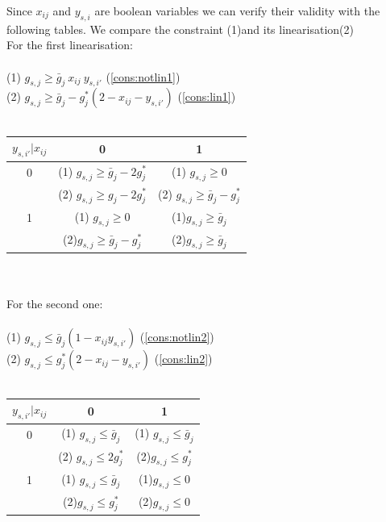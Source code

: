 \documentclass[letterpaper]{article}
\begin{document}
Since $x_{ij}$ and $y_{s,i}$ are boolean variables we can verify their validity with the following tables. We compare the constraint (1)and its linearisation(2)\\
For the first linearisation:\\ \\
(1) $g_{s,j} \geq \bar{g}_j \ x_{ij} \ y_{s,i'}$ (\ref{cons:notlin1})\\
(2) $g_{s,j} \ge \bar{g}_j - g^*_j (2 - x_{ij} - y_{s,i'})$ (\ref{cons:lin1})\\\\
\begin{tabular}{|c|c|c|}
  \hline
  \(\displaystyle y_{s,i'}|x_{ij} \) & 0 & 1 \\
  \hline
  0 & (1) \(\displaystyle g_{s,j} \geq \bar{g}_j - 2g^*_j \) & (1) \(\displaystyle g_{s,j} \geq 0 \) \\
   & (2) \(\displaystyle g_{s,j} \geq g_j - 2g^*_j \) & (2) \(\displaystyle g_{s,j} \geq \bar{g}_j - g^*_j \)\\
  \hline 
  1 & (1) \(\displaystyle g_{s,j} \geq 0 \) & (1)\(\displaystyle g_{s,j} \geq \bar{g}_j \) \\
   & (2)\(\displaystyle g_{s,j} \geq \bar{g}_j - g^*_j \) & (2)\(\displaystyle g_{s,j} \geq  \bar{g}_j\)\\
  \hline
\end{tabular}\\\\
For the second one:\\\\
(1) $g_{s,j} \le \bar{g}_j \left( 1 - x_{ij} y_{s,i'} \right)$ (\ref{cons:notlin2})\\
(2) $g_{s,j} \le g^*_j (2 - x_{ij} - y_{s,i'})$ (\ref{cons:lin2})\\\\
\begin{tabular}{|c|c|c|}
  \hline
  \(\displaystyle y_{s,i'}|x_{ij} \) & 0 & 1 \\
  \hline
  0 & (1) \(\displaystyle g_{s,j} \leq \bar{g}_j\) & (1) \(\displaystyle g_{s,j} \leq \bar{g}_j \) \\
   & (2) \(\displaystyle g_{s,j} \leq 2g^*_j \) & (2)\(\displaystyle g_{s,j} \leq g^*_j \)\\
  \hline
  1 & (1) \(\displaystyle g_{s,j} \leq \bar{g}_j \)  & (1)\(\displaystyle g_{s,j} \leq 0 \) \\
   & (2)\(\displaystyle g_{s,j} \leq g^*_j \) & (2)\(\displaystyle g_{s,j} \leq 0 \)\\
  \hline
\end{tabular}\\\\
\end{document}
